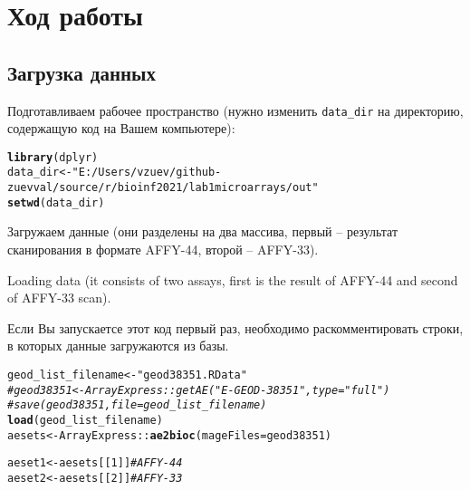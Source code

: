 \documentclass{article}
\makeatletter
\newcommand{\hlnum}[1]{\textcolor[rgb]{0.686,0.059,0.569}{#1}}%
\newcommand{\hlstr}[1]{\textcolor[rgb]{0.192,0.494,0.8}{#1}}%
\newcommand{\hlcom}[1]{\textcolor[rgb]{0.678,0.584,0.686}{\textit{#1}}}%
\newcommand{\hlopt}[1]{\textcolor[rgb]{0,0,0}{#1}}%
\newcommand{\hlstd}[1]{\textcolor[rgb]{0.345,0.345,0.345}{#1}}%
\newcommand{\hlkwb}[1]{\textcolor[rgb]{0.69,0.353,0.396}{#1}}%
\newcommand{\hlkwc}[1]{\textcolor[rgb]{0.333,0.667,0.333}{#1}}%
\newcommand{\hlkwd}[1]{\textcolor[rgb]{0.737,0.353,0.396}{\textbf{#1}}}%
\newenvironment{kframe}{%
 \def\at@end@of@kframe{}%
 \ifinner\ifhmode%
  \def\at@end@of@kframe{\end{minipage}}%
  \begin{minipage}{\columnwidth}%
 \fi\fi%
 \def\FrameCommand##1{\hskip\@totalleftmargin \hskip-\fboxsep
 \colorbox{shadecolor}{##1}\hskip-\fboxsep
     \hskip-\linewidth \hskip-\@totalleftmargin \hskip\columnwidth}%
 \MakeFramed {\advance\hsize-\width
   \@totalleftmargin\z@ \linewidth\hsize
   \@setminipage}}%
 {\par\unskip\endMakeFramed%
 \at@end@of@kframe}
\newenvironment{knitrout}{}{} %
\makeatother
\begin{document}
\section{Ход работы}

\subsection{Загрузка данных}

Подготавливаем рабочее пространство (нужно изменить \texttt{data\_dir} на директорию, содержащую код на Вашем компьютере):
\begin{knitrout}
\color{fgcolor}\begin{kframe}
\begin{alltt}
\hlkwd{library}\hlstd{(dplyr)}
\hlstd{data_dir} \hlkwb{<-} \hlstr{"E:/Users/vzuev/github-zuevval/source/r/bioinf2021/lab1microarrays/out"}
\hlkwd{setwd}\hlstd{(data_dir)}
\end{alltt}
\end{kframe}
\end{knitrout}

Загружаем данные (они разделены на два массива, первый -- результат сканирования в формате AFFY-44, второй -- AFFY-33).

Loading data (it consists of two assays, first is the result of AFFY-44 and second of AFFY-33 scan).

Если Вы запускаетсе этот код первый раз, необходимо раскомментировать строки, в которых данные загружаются из базы.

\begin{knitrout}
\color{fgcolor}\begin{kframe}
\begin{alltt}
\hlstd{geod_list_filename} \hlkwb{<-} \hlstr{"geod38351.RData"}
\hlcom{# geod38351 <- ArrayExpress::getAE("E-GEOD-38351", type = "full")}
\hlcom{# save(geod38351, file=geod_list_filename)}
\hlkwd{load}\hlstd{(geod_list_filename)}
\hlstd{aesets} \hlkwb{<-} \hlstd{ArrayExpress}\hlopt{::}\hlkwd{ae2bioc}\hlstd{(}\hlkwc{mageFiles} \hlstd{= geod38351)}
\end{alltt}

\begin{alltt}
\hlstd{aeset1} \hlkwb{<-} \hlstd{aesets[[}\hlnum{1}\hlstd{]]} \hlcom{# AFFY-44}
\hlstd{aeset2} \hlkwb{<-} \hlstd{aesets[[}\hlnum{2}\hlstd{]]} \hlcom{# AFFY-33}
\end{alltt}
\end{kframe}
\end{knitrout}
\end{document}
